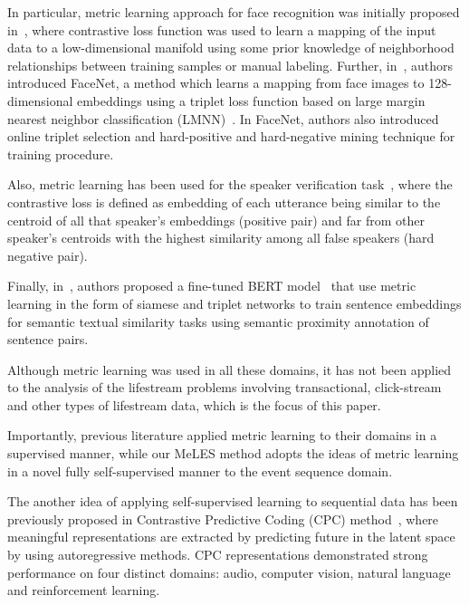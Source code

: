 \documentclass{article}
\begin{document}
In particular, metric learning approach for face recognition was initially proposed in~\cite{Chopra2005LearningAS}, where contrastive loss function was used to learn a mapping of the input data to a low-dimensional manifold using some prior knowledge of neighborhood relationships between training samples or manual labeling. Further, in~\cite{Schroff2015FaceNetAU}, authors introduced FaceNet, a method which learns a mapping from face images to 128-dimensional embeddings using a triplet loss function based on large margin nearest neighbor classification (LMNN)~\cite{Weinberger2005DistanceML}. In FaceNet, authors also introduced online triplet selection and hard-positive and hard-negative mining technique for training procedure.


Also, metric learning has been used for the speaker verification task~\cite{Wan2018GeneralizedEL}, where the contrastive loss is defined as embedding of each utterance being similar to the centroid of all that speaker's embeddings (positive pair) and far from other speaker's centroids with the highest similarity among all false speakers (hard negative pair).

Finally, in~\cite{Reimers2019SentenceBERTSE}, authors proposed a fine-tuned BERT model~\cite{Devlin2019BERTPO} that use metric learning in the form of siamese and triplet networks to train sentence embeddings for semantic textual similarity tasks using semantic proximity annotation of sentence pairs.

Although metric learning was used in all these domains, it has not been applied to the analysis of the lifestream problems involving transactional, click-stream and other types of lifestream data, which is the focus of this paper.

Importantly, previous literature applied metric learning to their domains in a supervised manner, while our MeLES method adopts the ideas of metric learning in a novel fully self-supervised manner to the event sequence domain.  

The another idea of applying self-supervised learning to sequential data has been previously proposed in Contrastive Predictive Coding (CPC) method~\cite{Oord2018RepresentationLW}, where meaningful representations are extracted by predicting future in the latent space by using autoregressive methods. CPC representations demonstrated strong performance on four distinct domains: audio, computer vision, natural language and reinforcement learning. 
\end{document}
